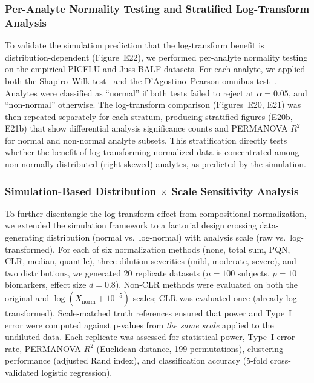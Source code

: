 \documentclass[12pt]{article}
\begin{document}
\subsubsection{Per-Analyte Normality Testing and Stratified Log-Transform Analysis}

To validate the simulation prediction that the log-transform benefit is distribution-dependent (Figure~E22), we performed per-analyte normality testing on the empirical PICFLU and Juss BALF datasets. For each analyte, we applied both the Shapiro--Wilk test~\cite{Shapiro1965} and the D'Agostino--Pearson omnibus test~\cite{DAgostino1973}. Analytes were classified as ``normal'' if both tests failed to reject at $\alpha = 0.05$, and ``non-normal'' otherwise. The log-transform comparison (Figures~E20, E21) was then repeated separately for each stratum, producing stratified figures (E20b, E21b) that show differential analysis significance counts and PERMANOVA $R^2$ for normal and non-normal analyte subsets. This stratification directly tests whether the benefit of log-transforming normalized data is concentrated among non-normally distributed (right-skewed) analytes, as predicted by the simulation.

\subsubsection{Simulation-Based Distribution $\times$ Scale Sensitivity Analysis}

To further disentangle the log-transform effect from compositional normalization, we extended the simulation framework to a factorial design crossing data-generating distribution (normal vs.\ log-normal) with analysis scale (raw vs.\ log-transformed). For each of six normalization methods (none, total sum, PQN, CLR, median, quantile), three dilution severities (mild, moderate, severe), and two distributions, we generated 20 replicate datasets ($n=100$ subjects, $p=10$ biomarkers, effect size $d=0.8$). Non-CLR methods were evaluated on both the original and $\log(X_{\text{norm}} + 10^{-5})$ scales; CLR was evaluated once (already log-transformed). Scale-matched truth references ensured that power and Type~I error were computed against p-values from \emph{the same scale} applied to the undiluted data. Each replicate was assessed for statistical power, Type~I error rate, PERMANOVA $R^2$ (Euclidean distance, 199 permutations), clustering performance (adjusted Rand index), and classification accuracy (5-fold cross-validated logistic regression).
\end{document}
